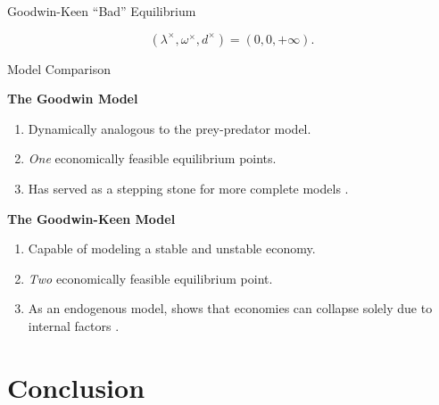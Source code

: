 \documentclass{beamer}
\begin{document}
\begin{frame}{Goodwin-Keen ``Bad'' Equilibrium}
    \begin{figure}
        
    \end{figure}
    \begin{equation*}
        (\lambda^\times, \omega^\times, d^\times) = (0, 0, +\infty).
    \end{equation*}
\end{frame}
\begin{frame}{Model Comparison}
    \begin{minipage}[t]{0.5\linewidth}
    \textbf{The Goodwin Model}
    \begin{enumerate}
        \item Dynamically analogous to the prey-predator model.
        \item \emph{One} economically feasible equilibrium points.
        \item Has served as a stepping stone for more complete models \citep{p5, p9}.
    \end{enumerate}   
    \end{minipage}%
    \begin{minipage}[t]{0.5\linewidth}
    \textbf{The Goodwin-Keen Model}
    \begin{enumerate}
        \item Capable of modeling a stable and unstable economy.
        \item \emph{Two} economically feasible equilibrium point.
        \item As an endogenous model, shows that economies can collapse solely due to internal factors \citep{p8}.
    \end{enumerate}
    \end{minipage}\par
\end{frame}




\section{Conclusion}
\end{document}
